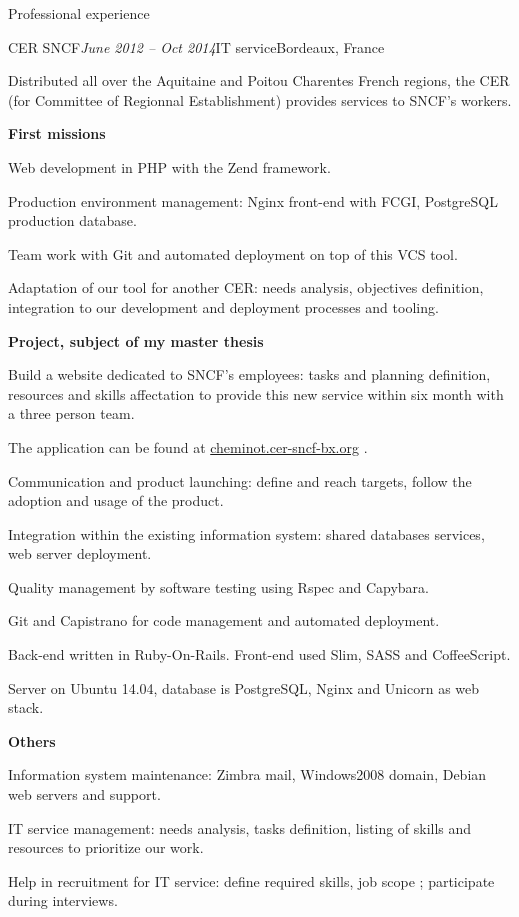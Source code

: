 \begin{rSection}{Professional experience}

  \begin{rSubsection}{CER SNCF}{\em June 2012 -- Oct 2014}{IT service}{Bordeaux, France}
    \item[] Distributed all over the Aquitaine and Poitou Charentes French regions, the CER (for Committee of Regionnal Establishment) provides services to SNCF's workers.

    \textbf{First missions}
      \item Web development in PHP with the Zend framework.
      \item Production environment management: Nginx front-end with FCGI, PostgreSQL production database.
      \item Team work with Git and automated deployment on top of this VCS tool.
      \item Adaptation of our tool for another CER: needs analysis, objectives definition, integration to our development and deployment processes and tooling.

    \textbf{Project, subject of my master thesis}
      \item Build a website dedicated to SNCF's employees: tasks and planning definition, resources and skills affectation to provide this new service within six month with a three person team.
      \item The application can be found at \href{http://cheminot.cer-sncf-bx.org}{cheminot.cer-sncf-bx.org} .
      \item Communication and product launching: define and reach targets, follow the adoption and usage of the product.
      \item Integration within the existing information system: shared databases services, web server deployment.
      \item Quality management by software testing using Rspec and Capybara.
      \item Git and Capistrano for code management and automated deployment.
      \item Back-end written in Ruby-On-Rails. Front-end used Slim, SASS and CoffeeScript.
      \item Server on Ubuntu 14.04, database is PostgreSQL, Nginx and Unicorn as web stack.

    \textbf{Others}
      \item Information system maintenance: Zimbra mail, Windows2008 domain, Debian web servers and support.
      \item IT service management: needs analysis, tasks definition, listing of skills and resources to prioritize our work.
      \item Help in recruitment for IT service: define required skills, job scope ; participate during interviews.


\end{rSubsection}
\end{rSection}
